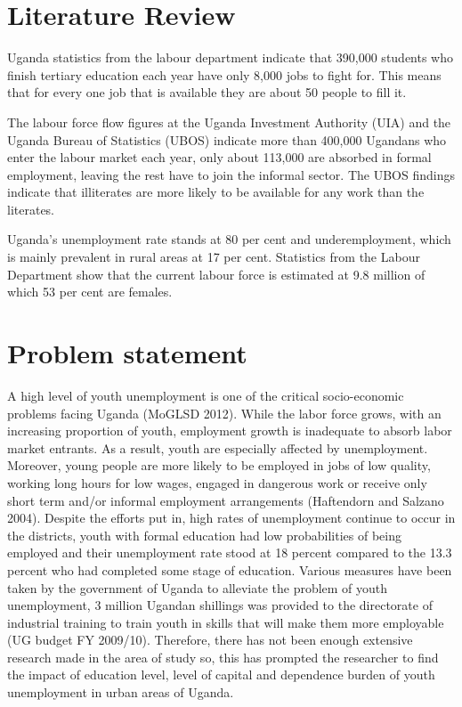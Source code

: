 \documentclass{article}                    %
\begin{document}
\section{Literature Review}
Uganda statistics from the labour department indicate that 390,000 students who finish tertiary education each year have only 8,000 jobs to fight for. This means that for every one job that is available they are about 50 people to fill it.

The labour force flow figures at the Uganda Investment Authority (UIA) and the Uganda Bureau of Statistics (UBOS) indicate  more than  400,000 Ugandans who enter the labour market each year, only about 113,000 are absorbed in formal employment, leaving the rest have to join the informal sector. The UBOS findings indicate that illiterates are more likely to be available for any work than the literates.


 
Uganda’s unemployment rate stands at 80 per cent and underemployment, which is mainly prevalent in rural areas at 17 per cent. Statistics from the Labour Department show that the current labour force is estimated at 9.8 million of which 53 per cent are females.
\section{Problem statement  }
A high level of youth unemployment is one of the critical socio-economic problems facing Uganda (MoGLSD 2012). While the labor force grows, with an increasing proportion of youth, employment growth is inadequate to absorb labor market entrants. As a result, youth are especially affected by unemployment. Moreover, young people are more likely to be employed in jobs of low quality, working long hours for low wages, engaged in dangerous work or receive only short term and/or informal employment arrangements (Haftendorn and Salzano 2004). Despite the efforts put in, high rates of unemployment continue to occur in the districts, youth with formal education had low probabilities of being employed and their unemployment rate stood at 18 percent compared to the 13.3 percent who had completed some stage of education. Various measures have been taken by the government of Uganda to alleviate the problem of youth unemployment, 3 million Ugandan shillings was provided to the directorate of industrial training to train youth in skills that will make them more employable (UG budget FY 2009/10). Therefore, there has not been enough extensive research made in the area of study so, this has  prompted the researcher to find the impact of education level, level of capital and dependence  burden of youth unemployment in urban areas of Uganda.
\end{document}
